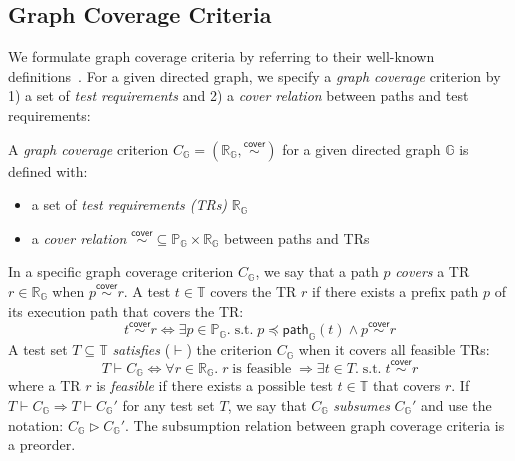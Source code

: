 \documentclass[acmsmall,review,screen]{acmart}
\newcommand{\tst}{{\; \text{s.t.} \; }}
\newcommand{\name}[1]{\textsf{#1}}
\newcommand{\graph}{\mathbb{G}}
\newcommand{\patset}[1]{\mathbb{P}_{#1}}
\newcommand{\pat}{p}
\newcommand{\patmap}[1]{\name{path}_{#1}}
\newcommand{\testset}{\mathbb{T}}
\newcommand{\test}{t}
\newcommand{\prefix}{\preceq}
\newcommand{\cover}{\overset{\name{cover}}{\sim}}
\newcommand{\trset}[1]{\mathbb{R}_{#1}}
\newcommand{\tr}{r}
\newcommand{\cov}[1]{C_{#1}}
\newcommand{\sat}{\vdash}
\newcommand{\subs}{\rhd}
\begin{document}


\subsection{Graph Coverage Criteria}\label{sec:cov}

We formulate graph coverage criteria by referring to their well-known
definitions~\cite{cov-def}.
%
For a given directed graph, we specify a \textit{graph coverage} criterion by 1)
a set of \textit{test requirements} and 2) a \textit{cover relation} between
paths and test requirements:


\begin{definition}\label{def:graph-cov}
  A \textit{graph coverage} criterion $\cov{\graph} = (\trset{\graph}, \cover)$
  for a given directed graph $\graph$ is defined with:
  \begin{itemize}
    \item a set of \textit{test requirements (TRs)} $\trset{\graph}$
    \item a \textit{cover relation} $\cover \subseteq \patset{\graph} \times
      \trset{\graph}$ between paths and TRs
  \end{itemize}
\end{definition}


In a specific graph coverage criterion $\cov{\graph}$, we say that a path $\pat$
\textit{covers} a TR $\tr \in \trset{\graph}$ when $\pat \cover
\tr$.
A test $\test \in \testset$ covers the TR $\tr$ if there exists
a prefix path $\pat$ of its execution path that covers the TR:
%
\begin{equation}\label{equ:test-cover}
  \test \cover \tr
  \iff
  \exists \pat \in \patset{\graph}. \tst
  \pat \prefix \patmap{\graph}(\test) \wedge
  \pat \cover \tr
\end{equation}
%
A test set $T \subseteq \testset$ \textit{satisfies} ($\sat$) the criterion
$\cov{\graph}$ when it covers all feasible TRs:
\begin{equation}\label{equ:sat}
  T \sat \cov{\graph}
  \iff
  \forall \tr \in \trset{\graph}. \;
  \tr \; \text{is feasible} \; \Rightarrow
  \exists \test \in T. \tst \test \cover \tr
\end{equation}
where a TR $\tr$ is \textit{feasible} if there exists a possible test $\test \in
\testset$ that covers $\tr$.
%
If $T \sat \cov{\graph} \Rightarrow T \sat \cov{\graph}'$ for any test set $T$,
we say that $\cov{\graph}$ \textit{subsumes} $\cov{\graph}'$ and use the
notation: $\cov{\graph} \subs \cov{\graph}'$.
%
The subsumption relation between graph coverage criteria is a preorder.
\end{document}
